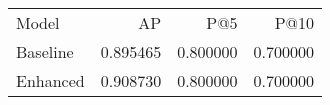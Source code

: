 \begin{tabular}{lrrr}
Model & AP & P@5 & P@10 \\
Baseline & 0.895465 & 0.800000 & 0.700000 \\
Enhanced & 0.908730 & 0.800000 & 0.700000 \\
\end{tabular}
